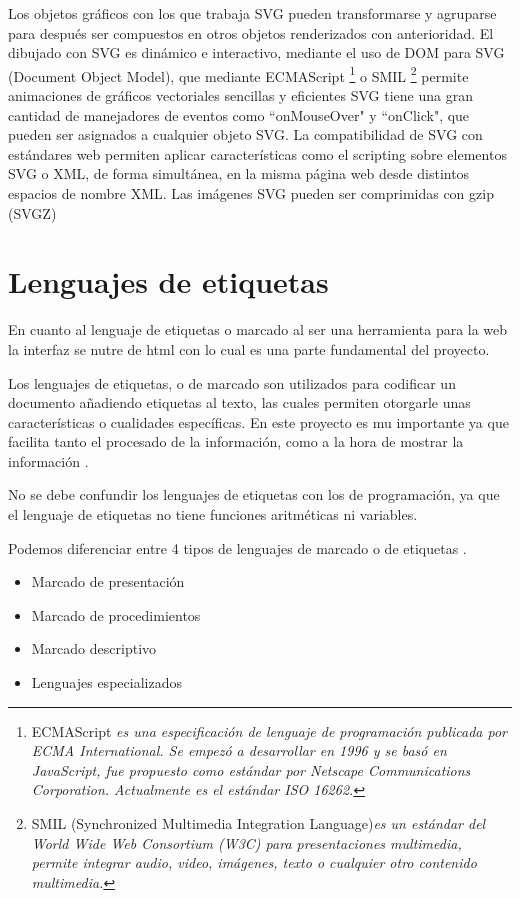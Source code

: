 Los objetos gráficos con los que trabaja SVG pueden transformarse y agruparse para después ser compuestos en otros objetos renderizados con anterioridad. 
El dibujado con SVG es dinámico e interactivo, mediante el uso de DOM para SVG (Document Object Model), que mediante ECMAScript \footnote{ECMAScript \textit{es una especificación de lenguaje de programación publicada por ECMA International. Se empezó a desarrollar en 1996 y se basó en JavaScript, fue propuesto como estándar por Netscape Communications Corporation. Actualmente es el estándar ISO 16262.}} o SMIL \footnote{SMIL (Synchronized Multimedia Integration Language)\textit{es un estándar del World Wide Web Consortium (W3C) para presentaciones multimedia, permite integrar audio, video, imágenes, texto o cualquier otro contenido multimedia.}} permite animaciones de gráficos vectoriales sencillas y eficientes
SVG tiene una gran cantidad de manejadores de eventos como ``onMouseOver" y ``onClick", que pueden ser asignados a cualquier objeto SVG. La compatibilidad de SVG con estándares web permiten aplicar características como el scripting sobre elementos SVG o XML, de forma simultánea, en la misma página web desde distintos espacios de nombre XML.
Las imágenes SVG pueden ser comprimidas con gzip (SVGZ)


\section{Lenguajes de etiquetas}\label{lenguajes-etiuetas}

En cuanto al lenguaje de etiquetas o marcado al ser una herramienta para la web la interfaz se nutre de html con lo cual es una parte fundamental del proyecto.

Los lenguajes de etiquetas, o de marcado son utilizados para codificar un documento añadiendo etiquetas al texto, las cuales permiten otorgarle unas características o cualidades específicas. En este proyecto es mu importante ya que facilita tanto el procesado de la información, como a la hora de mostrar la información \cite{noauthor_lenguaje_2017:a}.

No se debe confundir los lenguajes de etiquetas con los de programación, ya que el lenguaje de etiquetas no tiene funciones aritméticas ni variables.

Podemos diferenciar entre 4 tipos de lenguajes de marcado \cite{noauthor_1.1_nodate:a} o de etiquetas \cite{noauthor_lenguaje_nodate:a}.
\begin{itemize}
\item
Marcado de presentación
\item
Marcado de procedimientos
\item
Marcado descriptivo
\item
Lenguajes especializados

\end{itemize}

